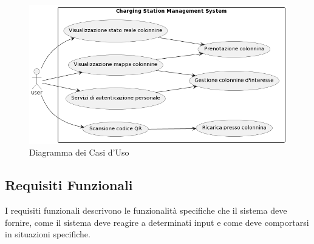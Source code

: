 \begin{figure}[htbp]
    \centering
    \includegraphics[width=\textwidth]{images/casiduso.png}
    \caption{Diagramma dei Casi d'Uso}
    \label{fig:casiduso}
\end{figure}

\subsection{Requisiti Funzionali}
I requisiti funzionali descrivono le funzionalità specifiche che il sistema deve fornire,
come il sistema deve reagire a determinati input e come deve comportarsi in situazioni specifiche.\\


